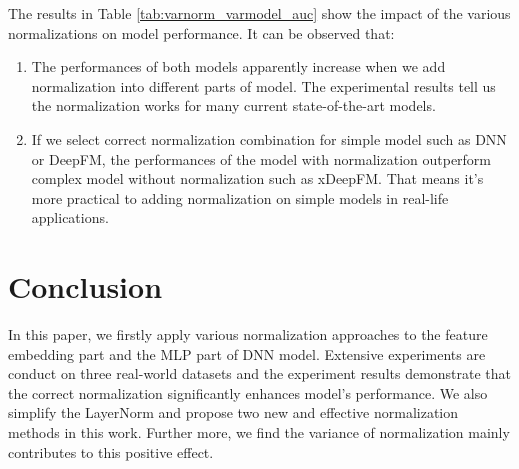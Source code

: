 \documentclass[sigconf]{acmart}
\begin{document}
    The results in Table \ref{tab:varnorm_varmodel_auc} show the impact of the various normalizations on model performance. It can be observed that:
    \begin{enumerate}
      \item The performances of both models apparently increase when we add normalization into different parts of model. The experimental results tell us the normalization works for many current state-of-the-art models.

      \item If we select correct normalization combination for simple model such as DNN or DeepFM, the performances of the model with normalization outperform complex model without normalization such as xDeepFM. That means it's more practical to adding normalization on simple models in real-life applications.
    \end{enumerate}




\section{Conclusion}
In this paper, we firstly apply various normalization approaches to the feature embedding part and the MLP part of DNN model.  Extensive experiments are conduct on three real-world datasets and the experiment results demonstrate that the correct normalization significantly enhances model's performance. We also simplify the LayerNorm and propose two new and effective normalization methods in this work. Further more, we find the variance of normalization mainly contributes to this positive effect.






\end{document}
